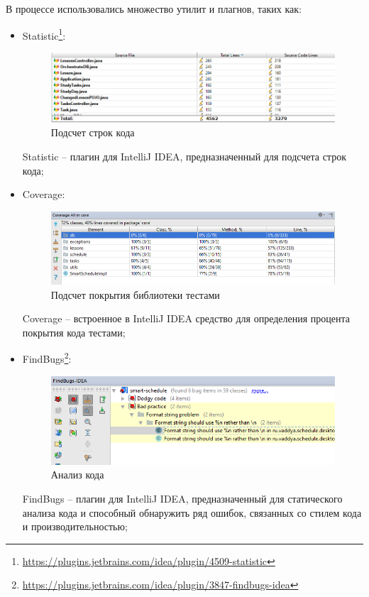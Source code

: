 В процессе использовались множество утилит и плагнов, таких как:
\begin{itemize}

\item Statistic\footnote{\url{https://plugins.jetbrains.com/idea/plugin/4509-statistic}}:
\begin{figure}[H]
	\begin{center}
		\includegraphics[scale=0.75]{pics/statistic}
		\caption{Подсчет строк кода} 
		\label{pic:statistic} %
	\end{center}
\end{figure}
Statistic -- плагин для IntelliJ IDEA, предназначенный для подсчета строк кода;

\item Coverage:
\begin{figure}[H]
	\begin{center}
		\includegraphics[scale=0.75]{pics/coverage}
		\caption{Подсчет покрытия библиотеки тестами} 
		\label{pic:coverage} %
	\end{center}
\end{figure}
Coverage -- встроенное в IntelliJ IDEA средство для определения процента покрытия кода тестами;

\item FindBugs\footnote{\url{https://plugins.jetbrains.com/idea/plugin/3847-findbugs-idea}}:
\begin{figure}[H]
	\begin{center}
		\includegraphics[scale=0.8]{pics/findbugs}
		\caption{Анализ кода} 
		\label{pic:findbugs} %
	\end{center}
\end{figure}

FindBugs -- плагин для IntelliJ IDEA, предназначенный для статического анализа кода и способный обнаружить ряд ошибок, связанных со стилем кода и производительностью;

\end{itemize}

